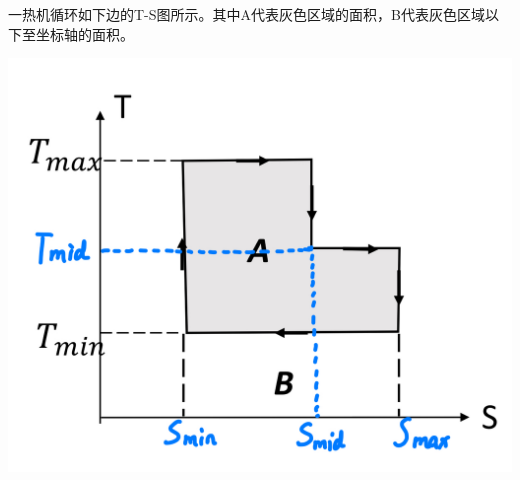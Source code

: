 \documentclass[reqno,a4paper,12pt]{amsart}
\begin{document}
\section{}
	一热机循环如下边的T-S图所示。其中A代表灰色区域的面积，B代表灰色区域以下至坐标轴的面积。
	\begin{center}
		\includegraphics[scale = 0.3]{hw2problem3.jpeg}
	\end{center}
\end{document}
